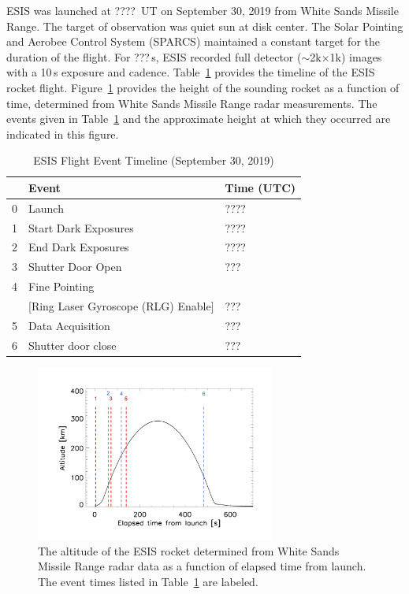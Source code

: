 ESIS was launched at ????~UT on September 30, 2019 from White Sands Missile Range.  The target of observation was quiet sun at disk center.  The Solar Pointing and Aerobee Control System (SPARCS) maintained a constant target for the duration of the flight.  For ???\,s, ESIS recorded full detector ($\sim$2k$\times$1k) images with a 10\,s exposure and cadence. %
Table~\ref{tab:timeline} provides the timeline of the ESIS rocket flight. Figure~\ref{fig:timeline} provides the height of the sounding rocket as a function of time, determined from White Sands Missile Range radar measurements.  The events given in Table~\ref{tab:timeline} and the approximate height at which they occurred are indicated in this figure.


\begin{center}
\begin{table}[ht]
\caption{ESIS Flight Event Timeline (September 30, 2019)}
\begin{tabular}{lll}\hline
{\bf} & {\bf Event} & {\bf Time (UTC)}\\ \hline
0 & Launch        &    ???? \\
1 & Start Dark Exposures  &  ????\\
2 & End Dark  Exposures  &  ????\\
3 & Shutter Door Open     &   ??? \\
4 & Fine Pointing    &    \\
 & [Ring Laser Gyroscope (RLG) Enable] & ???\\
5 & Data Acquisition     &     ???\\
6 & Shutter door close    &   ??? \\ \hline
\end{tabular}
\label{tab:timeline}
\end{table}
\end{center}

\begin{figure}[ht]
\begin{center}
\includegraphics[width=0.7\textwidth]{figures/altevents.png}
\caption{The altitude of the ESIS rocket determined from White Sands Missile Range radar data as a function of elapsed time from launch.  The event times listed in Table~\ref{tab:timeline} are labeled.}
\label{fig:timeline}
\end{center}
\end{figure}


